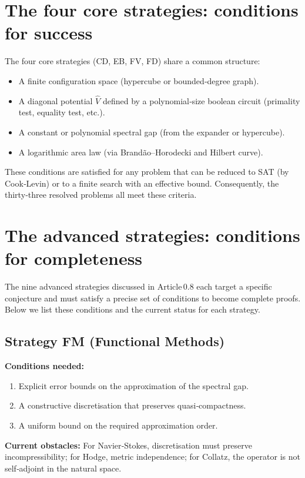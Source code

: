 \documentclass[11pt,a4paper]{article}
\begin{document}
\section{The four core strategies: conditions for success}

The four core strategies (CD, EB, FV, FD) share a common structure:
\begin{itemize}
\item A finite configuration space (hypercube or bounded‑degree graph).
\item A diagonal potential \(\hat{V}\) defined by a polynomial‑size boolean circuit (primality test, equality test, etc.).
\item A constant or polynomial spectral gap (from the expander or hypercube).
\item A logarithmic area law (via Brandão–Horodecki and Hilbert curve).
\end{itemize}
These conditions are satisfied for any problem that can be reduced to SAT (by Cook‑Levin) or to a finite search with an effective bound. Consequently, the thirty‑three resolved problems all meet these criteria.

\section{The advanced strategies: conditions for completeness}

The nine advanced strategies discussed in Article 0.8 each target a specific conjecture and must satisfy a precise set of conditions to become complete proofs. Below we list these conditions and the current status for each strategy.

\subsection{Strategy FM (Functional Methods)}
\textbf{Conditions needed:}
\begin{enumerate}
\item Explicit error bounds on the approximation of the spectral gap.
\item A constructive discretisation that preserves quasi‑compactness.
\item A uniform bound on the required approximation order.
\end{enumerate}
\textbf{Current obstacles:} For Navier‑Stokes, discretisation must preserve incompressibility; for Hodge, metric independence; for Collatz, the operator is not self‑adjoint in the natural space.
\end{document}
